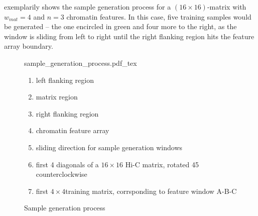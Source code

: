  exemplarily shows the sample generation process for a $(16\times16)$-matrix with $w_\mathit{mat}=4$ and $n=3$ chromatin features.
In this case, five training samples would be generated -- the one encircled in green and four more to the right, as the window is sliding from left to right until the
right flanking region hits the feature array boundary.
\begin{figure}[hbp]
 \begin{minipage}{0.60\textwidth}
   \centering
    \small
    {sample_generation_process.pdf_tex}
    \caption{Sample generation process}
    \label{fig:methods:sample_gen}
 \end{minipage}\hfill
 \begin{minipage}{0.3\textwidth}
 \scriptsize
  \begin{enumerate}[label=\Alph*:,leftmargin=*]
   \raggedright
    \item left flanking region
    \item matrix region
    \item right flanking region
    \item chromatin feature array
    \item sliding direction for sample generation windows
    \item first 4 diagonals of a $16\times16$ Hi-C matrix, rotated \SI{45}{\deg} counterclockwise
    \item first $4\times4$training matrix, corrsponding to feature window A-B-C
\end{enumerate}
 \end{minipage}
\end{figure}

